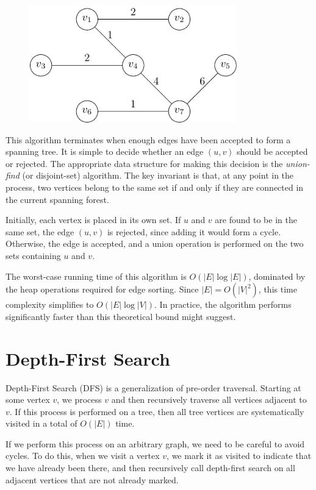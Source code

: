 \begin{minipage}{0.25\textwidth}
\begin{figure}[H]
  \centering
  \includegraphics[width=0.8\textwidth]{Figure/Kruskal_algo_d7.pdf}
\end{figure}
\end{minipage}

This algorithm terminates when enough edges have been accepted to form a spanning tree. It is simple to decide whether an edge \((u, v)\) should be accepted or rejected. The appropriate data structure for making this decision is the \emph{union-find} (or disjoint-set) algorithm. The key invariant is that, at any point in the process, two vertices belong to the same set if and only if they are connected in the current spanning forest.

Initially, each vertex is placed in its own set. If \(u\) and \(v\) are found to be in the same set, the edge \((u, v)\) is rejected, since adding it would form a cycle. Otherwise, the edge is accepted, and a union operation is performed on the two sets containing \(u\) and \(v\).

The worst-case running time of this algorithm is \(O(\vert E \vert \log \vert E \vert)\), dominated by the heap operations required for edge sorting. Since \(\vert E \vert = O(\vert V \vert^2)\), this time complexity simplifies to \(O(\vert E \vert \log \vert V \vert)\). In practice, the algorithm performs significantly faster than this theoretical bound might suggest.

\section{Depth-First Search}
Depth-First Search (DFS) is a generalization of pre-order traversal. Starting at some vertex \(v\), we process \(v\) and then recursively traverse all vertices adjacent to \(v\). If this process is performed on a tree, then all tree vertices are systematically visited in a total of \(O(\vert E \vert)\) time.

If we perform this process on an arbitrary graph, we need to be careful to avoid cycles. To do this, when we visit a vertex \(v\), we mark it as visited to indicate that we have already been there, and then recursively call depth-first search on all adjacent vertices that are not already marked.
